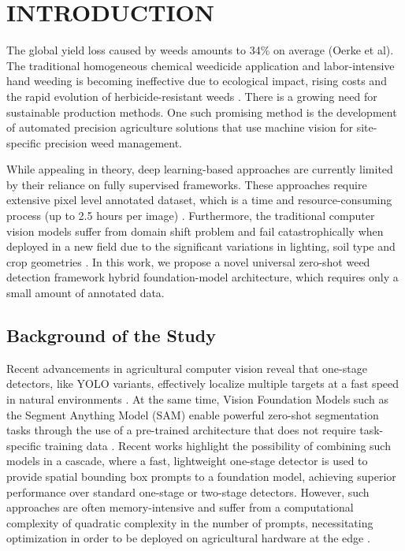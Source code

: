 \section{INTRODUCTION}

The global yield loss caused by weeds amounts to 34\% on average (Oerke et al). The traditional homogeneous chemical weedicide application and labor-intensive hand weeding is becoming ineffective due to ecological impact, rising costs and the rapid evolution of herbicide-resistant weeds \cite{gao2025a}. There is a growing need for sustainable production methods. One such promising method is the development of automated precision agriculture solutions that use machine vision for site-specific precision weed management.

While  appealing in theory, deep learning-based approaches are currently limited by their reliance on fully supervised frameworks. These approaches require extensive pixel level annotated dataset, which is a time and resource-consuming process (up to 2.5 hours per image) \cite{nadeem2026}. Furthermore, the traditional computer vision models suffer from domain shift problem and fail catastrophically when deployed in a new field due to the significant variations in lighting, soil type and crop geometries \cite{magistri2023}. In this work, we propose a novel universal zero-shot weed detection framework hybrid foundation-model architecture, which requires only a small amount of annotated data.

\subsection{Background of the Study}

Recent advancements in agricultural computer vision reveal that one-stage detectors, like YOLO variants, effectively localize multiple targets at a fast speed in natural environments \cite{gao2024}. At the same time, Vision Foundation Models such as the Segment Anything Model (SAM) enable powerful zero-shot segmentation tasks through the use of a pre-trained architecture that does not require task-specific training data \cite{ghose2025}. Recent works highlight the possibility of combining such models in a cascade, where a fast, lightweight one-stage detector is used to provide spatial bounding box prompts to a foundation model, achieving superior performance over standard one-stage or two-stage detectors. However, such approaches are often memory-intensive and suffer from a computational complexity of quadratic complexity in the number of prompts, necessitating optimization in order to be deployed on agricultural hardware at the edge \cite{mo2025}.


